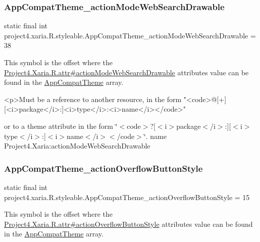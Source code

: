 \subsubsection{\texorpdfstring{App\+Compat\+Theme\+\_\+action\+Mode\+Web\+Search\+Drawable}{AppCompatTheme\_actionModeWebSearchDrawable}}
{\footnotesize\ttfamily static final int project4.\+xaria.\+R.\+styleable.\+App\+Compat\+Theme\+\_\+action\+Mode\+Web\+Search\+Drawable = 38\hspace{0.3cm}{\ttfamily [static]}}

This symbol is the offset where the \hyperlink{}{Project4.\+Xaria.\+R.\+attr\#action\+Mode\+Web\+Search\+Drawable} attribute\textquotesingle{}s value can be found in the \hyperlink{classproject4_1_1xaria_1_1R_1_1styleable_aad8bec413e2350f9404e6ff0e831a85d}{App\+Compat\+Theme} array.

\begin{DoxyVerb}      <p>Must be a reference to another resource, in the form "<code>@[+][<i>package</i>:]<i>type</i>:<i>name</i></code>"
\end{DoxyVerb}
 or to a theme attribute in the form \char`\"{}$<$code$>$?\mbox{[}$<$i$>$package$<$/i$>$\+:\mbox{]}\mbox{[}$<$i$>$type$<$/i$>$\+:\mbox{]}$<$i$>$name$<$/i$>$$<$/code$>$\char`\"{}.  name Project4.\+Xaria\+:action\+Mode\+Web\+Search\+Drawable \mbox{\label{classproject4_1_1xaria_1_1R_1_1styleable_abb732edffcf1b36c734cb674eb0a4092}} 
\subsubsection{\texorpdfstring{App\+Compat\+Theme\+\_\+action\+Overflow\+Button\+Style}{AppCompatTheme\_actionOverflowButtonStyle}}
{\footnotesize\ttfamily static final int project4.\+xaria.\+R.\+styleable.\+App\+Compat\+Theme\+\_\+action\+Overflow\+Button\+Style = 15\hspace{0.3cm}{\ttfamily [static]}}

This symbol is the offset where the \hyperlink{}{Project4.\+Xaria.\+R.\+attr\#action\+Overflow\+Button\+Style} attribute\textquotesingle{}s value can be found in the \hyperlink{classproject4_1_1xaria_1_1R_1_1styleable_aad8bec413e2350f9404e6ff0e831a85d}{App\+Compat\+Theme} array.

